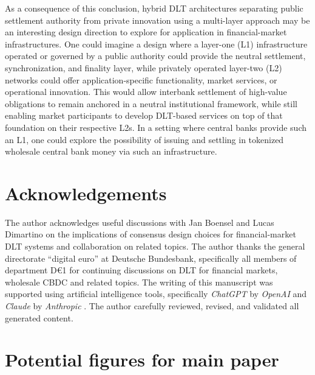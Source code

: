 \documentclass[
reprint,
showkeys,
superscriptaddress,
aps,
pra,
longbibliography,
nofootinbib,
]{revtex4-2}
\theoremstyle{definition}\newtheorem{definition}{Definition}
\begin{document}
As a consequence of this conclusion, hybrid DLT architectures separating public settlement authority from private innovation using a multi-layer approach may be an interesting design direction to explore for application in financial-market infrastructures.
One could imagine a design where a layer-one (L1) infrastructure operated or governed by a public authority could provide the neutral settlement, synchronization, and finality layer, while privately operated layer-two (L2) networks could offer application-specific functionality, market services, or operational innovation.
This would allow interbank settlement of high-value obligations to remain anchored in a neutral institutional framework, while still enabling market participants to develop DLT-based services on top of that foundation on their respective L2s.
In a setting where central banks provide such an L1, one could explore the possibility of issuing and settling in tokenized wholesale central bank money via such an infrastructure.

\section*{Acknowledgements}
The author acknowledges useful discussions with Jan Boensel and Lucas Dimartino on the implications of consensus design choices for financial-market DLT systems and collaboration on related topics.
The author thanks the general directorate ``digital euro'' at Deutsche Bundesbank, specifically all members of department D\euro{}1 for continuing discussions on DLT for financial markets, wholesale CBDC and related topics.
The writing of this manuscript was supported using artificial intelligence tools, specifically \textit{ChatGPT} by \textit{OpenAI} \cite{chatgpt} and \textit{Claude} by \textit{Anthropic} \cite{claude}.
The author carefully reviewed, revised, and validated all generated content.


\FloatBarrier


\appendix
\section{Potential figures for main paper}







% 
\end{document}
